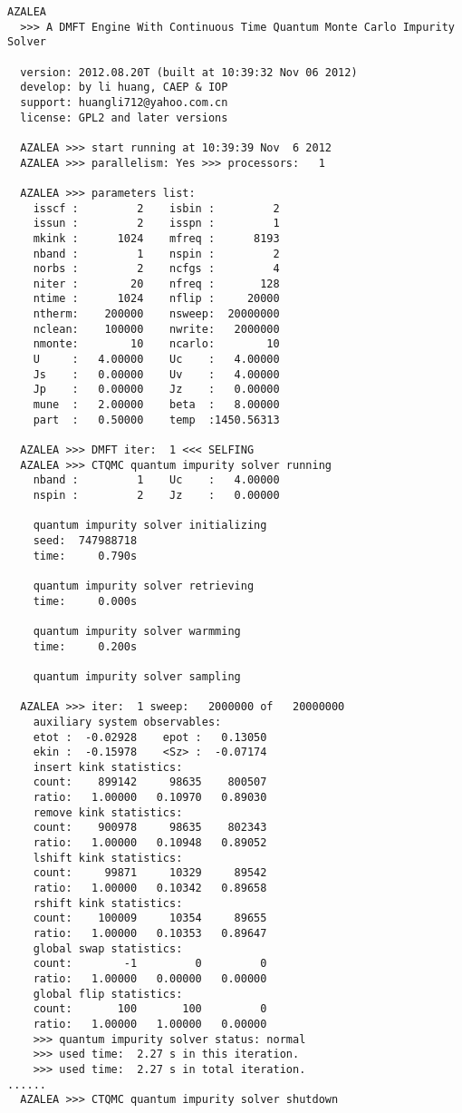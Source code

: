 \begin{lstlisting}[frame=single]
  AZALEA
  >>> A DMFT Engine With Continuous Time Quantum Monte Carlo Impurity Solver
 
  version: 2012.08.20T (built at 10:39:32 Nov 06 2012)
  develop: by li huang, CAEP & IOP
  support: huangli712@yahoo.com.cn
  license: GPL2 and later versions
 
  AZALEA >>> start running at 10:39:39 Nov  6 2012
  AZALEA >>> parallelism: Yes >>> processors:   1
 
  AZALEA >>> parameters list:
    isscf :         2    isbin :         2
    issun :         2    isspn :         1
    mkink :      1024    mfreq :      8193
    nband :         1    nspin :         2
    norbs :         2    ncfgs :         4
    niter :        20    nfreq :       128
    ntime :      1024    nflip :     20000
    ntherm:    200000    nsweep:  20000000
    nclean:    100000    nwrite:   2000000
    nmonte:        10    ncarlo:        10
    U     :   4.00000    Uc    :   4.00000
    Js    :   0.00000    Uv    :   4.00000
    Jp    :   0.00000    Jz    :   0.00000
    mune  :   2.00000    beta  :   8.00000
    part  :   0.50000    temp  :1450.56313
 
  AZALEA >>> DMFT iter:  1 <<< SELFING
  AZALEA >>> CTQMC quantum impurity solver running
    nband :         1    Uc    :   4.00000
    nspin :         2    Jz    :   0.00000
 
    quantum impurity solver initializing
    seed:  747988718
    time:     0.790s
 
    quantum impurity solver retrieving
    time:     0.000s
 
    quantum impurity solver warmming
    time:     0.200s
 
    quantum impurity solver sampling
 
  AZALEA >>> iter:  1 sweep:   2000000 of   20000000
    auxiliary system observables:
    etot :  -0.02928    epot :   0.13050
    ekin :  -0.15978    <Sz> :  -0.07174
    insert kink statistics:
    count:    899142     98635    800507
    ratio:   1.00000   0.10970   0.89030
    remove kink statistics:
    count:    900978     98635    802343
    ratio:   1.00000   0.10948   0.89052
    lshift kink statistics:
    count:     99871     10329     89542
    ratio:   1.00000   0.10342   0.89658
    rshift kink statistics:
    count:    100009     10354     89655
    ratio:   1.00000   0.10353   0.89647
    global swap statistics:
    count:        -1         0         0
    ratio:   1.00000   0.00000   0.00000
    global flip statistics:
    count:       100       100         0
    ratio:   1.00000   1.00000   0.00000
    >>> quantum impurity solver status: normal
    >>> used time:  2.27 s in this iteration.
    >>> used time:  2.27 s in total iteration.
......
  AZALEA >>> CTQMC quantum impurity solver shutdown
 

\end{lstlisting}
